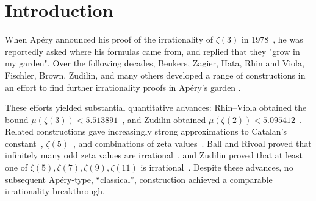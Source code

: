 \documentclass[oneside,english,11pt]{amsart}
\begin{document}
\maketitle


\clearpage
\section{Introduction}
\label{sec:introduction}

When Ap\'ery announced his proof of the irrationality of $\zeta(3)$ in 1978~\cite{apery1979irrationalite,van1979proof}, he was reportedly asked where his formulas came from, and replied that they "grow in my garden". 
Over the following decades, Beukers, Zagier, Hata, Rhin and Viola, Fischler, Brown, Zudilin, and many others developed a range of constructions in an effort to find further irrationality proofs in Ap\'ery's garden \cite{beukers1979note,hata1995beukers,rhin1996permutation,hata2000zeta3,rhinViola2001,fischler2004bourbaki,zudilin2002arithmetic,zagier2006integral,zudilin2014zeta2}.


These efforts yielded substantial quantitative advances: Rhin--Viola obtained the bound $\mu(\zeta(3))<5.513891$~\cite{rhinViola2001}, and Zudilin obtained $\mu(\zeta(2))<5.095412$~\cite{zudilin2014zeta2}. 
Related constructions gave increasingly strong approximations to Catalan's constant~\cite{nesterenko2016catalan,viola2022catalan}, $\zeta(5)$~\cite{brownZudilin2022zeta5}, and combinations of zeta values~\cite{dauguetZudilin2014}. 
Ball and Rivoal proved that infinitely many odd zeta values are irrational~\cite{ball2001irrationalite}, and Zudilin proved that at least one of $\zeta(5),\zeta(7),\zeta(9),\zeta(11)$ is irrational~\cite{zudilin2002arithmetic}.
Despite these advances, no subsequent Ap\'ery-type, ``classical'', construction achieved a comparable irrationality breakthrough.
\end{document}
